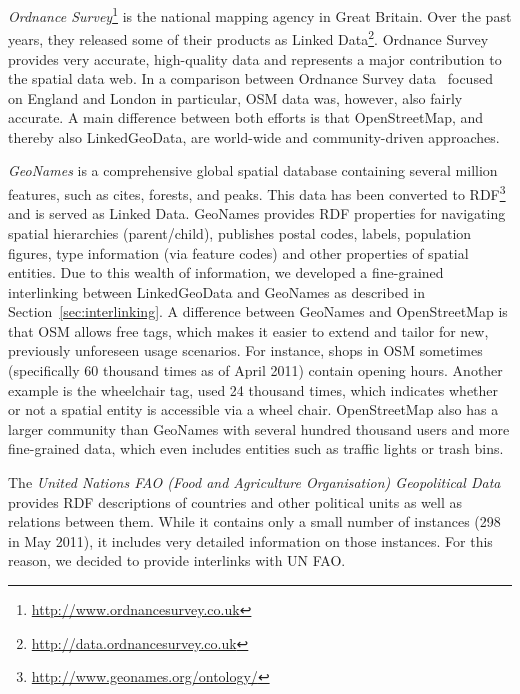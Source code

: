 \begin{description}
\item \emph{Ordnance Survey}\footnote{\url{http://www.ordnancesurvey.co.uk}} is the national mapping agency in Great Britain. 
Over the past years, they released some of their products as Linked Data\footnote{\url{http://data.ordnancesurvey.co.uk}}. 
Ordnance Survey provides very accurate, high-quality data and represents a major contribution to the spatial data web. 
In a comparison between Ordnance Survey data~\cite{osm_ordnance_survey} focused on England and London in particular, OSM data was, however, also fairly accurate. 
A main difference between both efforts is that OpenStreetMap, and thereby also LinkedGeoData, are world-wide and community-driven approaches.
\item \emph{GeoNames} is a comprehensive global spatial database containing several million
features, such as cites, forests, and peaks.
This data has been converted to RDF\footnote{\url{http://www.geonames.org/ontology/}} and is served as Linked Data.
GeoNames provides RDF properties for navigating spatial hierarchies (parent/child), publishes postal codes, labels, population figures, type information (via feature codes) and other properties of spatial entities. 
Due to this wealth of information, we developed a fine-grained interlinking between LinkedGeoData and GeoNames as described in Section~\ref{sec:interlinking}. 
A difference between GeoNames and OpenStreetMap is that OSM allows free tags, which makes it easier to extend and tailor for new, previously unforeseen usage scenarios.
For instance, shops in OSM sometimes (specifically 60 thousand times as of April 2011) contain opening hours.
Another example is the wheelchair tag, used 24 thousand times, which indicates whether or not a spatial entity is accessible via a wheel chair. 
OpenStreetMap also has a larger community than GeoNames with several hundred thousand users and more fine-grained data, which even includes entities such as traffic lights or trash bins.
\item The \emph{United Nations FAO (Food and Agriculture Organisation) Geopolitical Data}~\cite{un_fao} provides RDF descriptions of countries and other political units as well as relations between them. 
While it contains only a small number of instances (298 in May 2011), it includes very detailed information on those instances. 
For this reason, we decided to provide interlinks with UN FAO.

\end{description}
